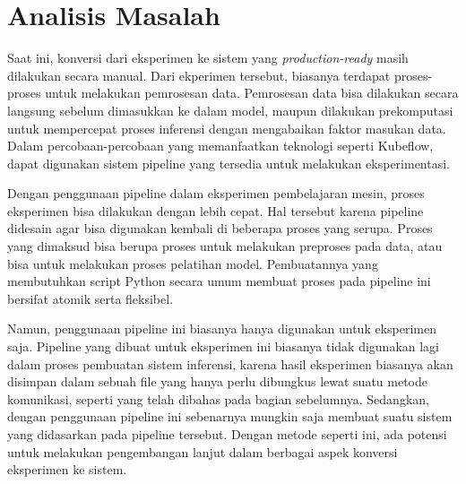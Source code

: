\section{Analisis Masalah}

Saat ini, konversi dari eksperimen ke sistem yang \textit{production-ready} masih dilakukan secara manual.
Dari ekperimen tersebut, biasanya terdapat proses-proses untuk melakukan pemrosesan data.
Pemrosesan data bisa dilakukan secara langsung sebelum dimasukkan ke dalam model, maupun dilakukan prekomputasi untuk mempercepat proses inferensi dengan mengabaikan faktor masukan data.
Dalam percobaan-percobaan yang memanfaatkan teknologi seperti Kubeflow, dapat digunakan sistem pipeline yang tersedia untuk melakukan eksperimentasi.

Dengan penggunaan pipeline dalam eksperimen pembelajaran mesin, proses eksperimen bisa dilakukan dengan lebih cepat.
Hal tersebut karena pipeline didesain agar bisa digunakan kembali di beberapa proses yang serupa.
Proses yang dimaksud bisa berupa proses untuk melakukan preproses pada data, atau bisa untuk melakukan proses pelatihan model.
Pembuatannya yang membutuhkan script Python secara umum membuat proses pada pipeline ini bersifat atomik serta fleksibel.

Namun, penggunaan pipeline ini biasanya hanya digunakan untuk eksperimen saja.
Pipeline yang dibuat untuk eksperimen ini biasanya tidak digunakan lagi dalam proses pembuatan sistem inferensi, karena hasil eksperimen biasanya akan disimpan dalam sebuah file yang hanya perlu dibungkus lewat suatu metode komunikasi, seperti yang telah dibahas pada bagian sebelumnya.
Sedangkan, dengan penggunaan pipeline ini sebenarnya mungkin saja membuat suatu sistem yang didasarkan pada pipeline tersebut.
Dengan metode seperti ini, ada potensi untuk melakukan pengembangan lanjut dalam berbagai aspek konversi eksperimen ke sistem.

